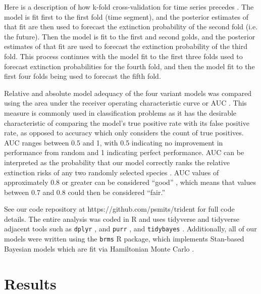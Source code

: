 \documentclass[12pt,letterpaper]{article}
\begin{document}
\begin{refsection}
Here is a description of how k-fold cross-validation for time series precedes \citep{Arlot2010,Bergmeir2016}. The model is fit first to the first fold (time segment), and the posterior estimates of that fit are then used to forecast the extinction probability of the second fold (i.e. the future). Then the model is fit to the first and second golds, and the posterior estimates of that fit are used to forecast the extinction probability of the third fold. This process continues with the model fit to the first three folds used to forecast extinction probabilities for the fourth fold, and then the model fit to the first four folds being used to forecast the fifth fold. 

Relative and absolute model adequacy of the four variant models was compared using the area under the receiver operating characteristic curve or AUC \citep{Fawcett2006,Mason2002}. This measure is commonly used in classification problems as it has the desirable characteristic of comparing the model's true positive rate with its false positive rate, as opposed to accuracy which only considers the count of true positives. AUC ranges between 0.5 and 1, with 0.5 indicating no improvement in performance from random and 1 indicating perfect performance. AUC can be interpreted as the probability that our model correctly ranks the relative extinction risks of any two randomly selected species \citep{Fawcett2006,Mason2002}. AUC values of approximately 0.8 or greater can be considered ``good'' \citep{ACCDA}, which means that values between 0.7 and 0.8 could then be considered ``fair.''


See our code repository at https://github.com/psmits/trident for full code details. The entire analysis was coded in R and uses tidyverse and tidyverse adjacent tools such as \texttt{dplyr} \citep{dplyr}, and \texttt{purr} \citep{purrr}, and \texttt{tidybayes} \citep{tidybayes}. Additionally, all of our models were written using the \texttt{brms} \citep{brms2017,brms2018} R package, which implements Stan-based Bayesian models which are fit via Hamiltonian Monte Carlo \citep{StanManual}.


\section{Results}


\end{refsection}
\end{document}
